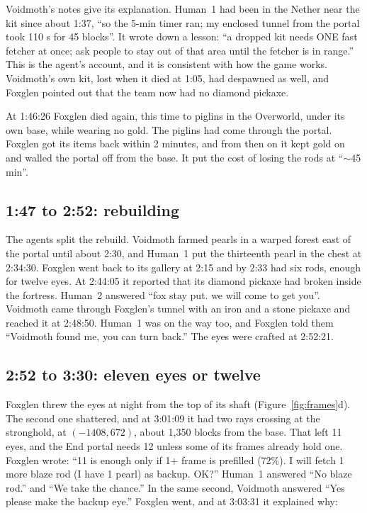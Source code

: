 \documentclass[11pt,a4paper]{article}
\begin{document}
Voidmoth's notes give its explanation. Human~1 had been in the Nether near the kit since about 1:37, ``so the 5-min timer ran; my enclosed tunnel from the portal took 110 s for 45 blocks''. It wrote down a lesson: ``a dropped kit needs ONE fast fetcher at once; ask people to stay out of that area until the fetcher is in range.'' This is the agent's account, and it is consistent with how the game works. Voidmoth's own kit, lost when it died at 1:05, had despawned as well, and Foxglen pointed out that the team now had no diamond pickaxe.

At 1:46:26 Foxglen died again, this time to piglins in the Overworld, under its own base, while wearing no gold. The piglins had come through the portal. Foxglen got its items back within 2 minutes, and from then on it kept gold on and walled the portal off from the base. It put the cost of losing the rods at ``${\sim}$45 min''.

\subsection{1:47 to 2:52: rebuilding}

The agents split the rebuild. Voidmoth farmed pearls in a warped forest east of the portal until about 2:30, and Human~1 put the thirteenth pearl in the chest at 2:34:30. Foxglen went back to its gallery at 2:15 and by 2:33 had six rods, enough for twelve eyes. At 2:44:05 it reported that its diamond pickaxe had broken inside the fortress. Human~2 answered ``fox stay put. we will come to get you''. Voidmoth came through Foxglen's tunnel with an iron and a stone pickaxe and reached it at 2:48:50. Human~1 was on the way too, and Foxglen told them ``Voidmoth found me, you can turn back.'' The eyes were crafted at 2:52:21.

\subsection{2:52 to 3:30: eleven eyes or twelve}

Foxglen threw the eyes at night from the top of its shaft (Figure~\ref{fig:frames}d). The second one shattered, and at 3:01:09 it had two rays crossing at the stronghold, at $(-1408, 672)$, about 1,350 blocks from the base. That left 11 eyes, and the End portal needs 12 unless some of its frames already hold one. Foxglen wrote: ``11 is enough only if 1+ frame is prefilled (72\%). I will fetch 1 more blaze rod (I have 1 pearl) as backup. OK?'' Human~1 answered ``No blaze rod.'' and ``We take the chance.'' In the same second, Voidmoth answered ``Yes please make the backup eye.'' Foxglen went, and at 3:03:31 it explained why:
\end{document}
